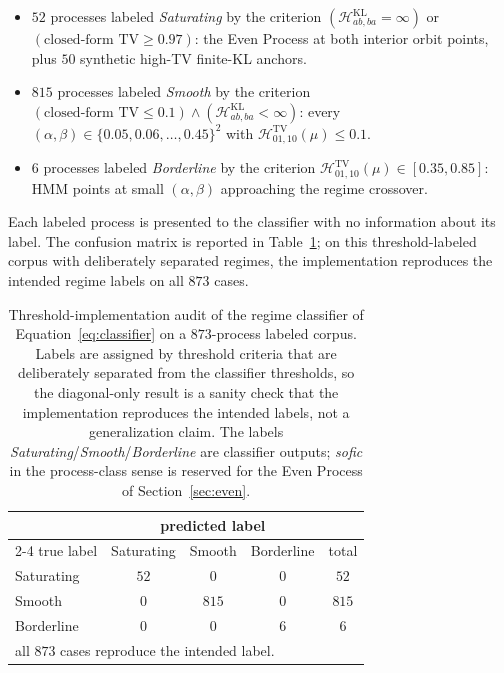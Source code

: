\documentclass[11pt,a4paper]{article}
\theoremstyle{plain}
\theoremstyle{definition}
\theoremstyle{remark}
\begin{document}
\begin{itemize}[itemsep=2pt,topsep=2pt]
    \item $52$ processes labeled \emph{Saturating} by the criterion $(\mathcal{H}^{\mathrm{KL}}_{ab,ba} = \infty)$ or $(\text{closed-form TV} \geq 0.97)$: the Even Process at both interior orbit points, plus $50$ synthetic high-TV finite-KL anchors.
    \item $815$ processes labeled \emph{Smooth} by the criterion $(\text{closed-form TV} \leq 0.1) \wedge (\mathcal{H}^{\mathrm{KL}}_{ab,ba} < \infty)$: every $(\alpha, \beta) \in \{0.05, 0.06, \ldots, 0.45\}^2$ with $\mathcal{H}^{\mathrm{TV}}_{01,10}(\mu) \leq 0.1$.
    \item $6$ processes labeled \emph{Borderline} by the criterion $\mathcal{H}^{\mathrm{TV}}_{01,10}(\mu) \in [0.35, 0.85]$: HMM points at small $(\alpha, \beta)$ approaching the regime crossover.
\end{itemize}

Each labeled process is presented to the classifier with no information about its label. The confusion matrix is reported in Table~\ref{tab:confusion}; on this threshold-labeled corpus with deliberately separated regimes, the implementation reproduces the intended regime labels on all $873$ cases.

\begin{table}[ht]
\centering
\begin{tabular}{lcccc}
\toprule
& \multicolumn{3}{c}{predicted label} & \\
\cmidrule(lr){2-4}
true label & Saturating & Smooth & Borderline & total \\
\midrule
Saturating  & $52$ & $0$   & $0$  & $52$  \\
Smooth      & $0$  & $815$ & $0$  & $815$ \\
Borderline  & $0$  & $0$   & $6$  & $6$   \\
\midrule
\multicolumn{4}{l}{all $873$ cases reproduce the intended label.} & \\
\bottomrule
\end{tabular}
\caption{Threshold-implementation audit of the regime classifier of Equation~\eqref{eq:classifier} on a $873$-process labeled corpus. Labels are assigned by threshold criteria that are deliberately separated from the classifier thresholds, so the diagonal-only result is a sanity check that the implementation reproduces the intended labels, not a generalization claim. The labels \emph{Saturating}/\emph{Smooth}/\emph{Borderline} are classifier outputs; \emph{sofic} in the process-class sense is reserved for the Even Process of Section~\ref{sec:even}.}
\label{tab:confusion}
\end{table}
\end{document}
